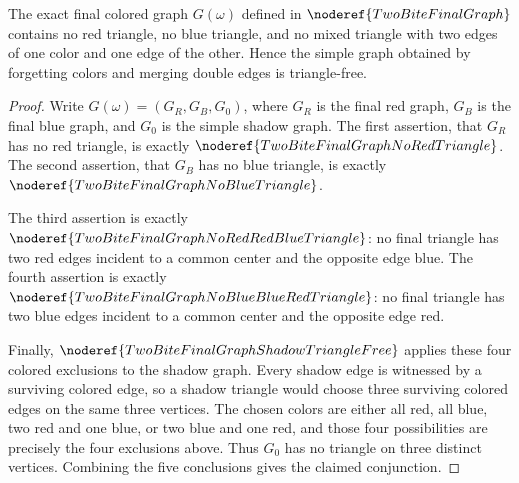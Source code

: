 \begin{lemma}
The exact final colored graph \(G(\omega)\) defined in
\(\noderef{TwoBiteFinalGraph}\) contains no red triangle, no blue triangle, and
no mixed triangle with two edges of one color and one edge of the other.  Hence
the simple graph obtained by forgetting colors and merging double edges is
triangle-free.
\end{lemma}
\begin{proof}
Write \(G(\omega)=(G_R,G_B,G_0)\), where \(G_R\) is the final red graph,
\(G_B\) is the final blue graph, and \(G_0\) is the simple shadow graph.  The
first assertion, that \(G_R\) has no red triangle, is exactly
\(\noderef{TwoBiteFinalGraphNoRedTriangle}\).  The second assertion, that
\(G_B\) has no blue triangle, is exactly
\(\noderef{TwoBiteFinalGraphNoBlueTriangle}\).

The third assertion is exactly
\(\noderef{TwoBiteFinalGraphNoRedRedBlueTriangle}\): no final triangle has two
red edges incident to a common center and the opposite edge blue.  The fourth
assertion is exactly \(\noderef{TwoBiteFinalGraphNoBlueBlueRedTriangle}\): no
final triangle has two blue edges incident to a common center and the opposite
edge red.

Finally, \(\noderef{TwoBiteFinalGraphShadowTriangleFree}\) applies these four
colored exclusions to the shadow graph.  Every shadow edge is witnessed by a
surviving colored edge, so a shadow triangle would choose three surviving
colored edges on the same three vertices.  The chosen colors are either all
red, all blue, two red and one blue, or two blue and one red, and those four
possibilities are precisely the four exclusions above.  Thus \(G_0\) has no
triangle on three distinct vertices.  Combining the five conclusions gives the
claimed conjunction.
\end{proof}
